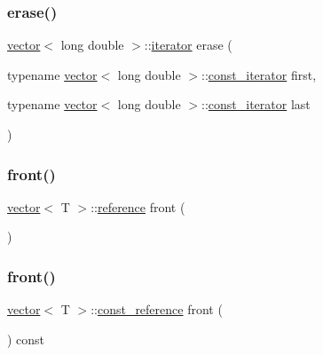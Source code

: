 \subsubsection{\texorpdfstring{erase()}{erase()}\hspace{0.1cm}{\footnotesize\ttfamily [28/28]}}
{\footnotesize\ttfamily \mbox{\hyperlink{classvector}{vector}}$<$ long double $>$\+::\mbox{\hyperlink{classvector_a35c955cacac6aacaa1e82874b1628865}{iterator}} erase (\begin{DoxyParamCaption}\item[{typename \mbox{\hyperlink{classvector}{vector}}$<$ long double $>$\+::\mbox{\hyperlink{classvector_a2fc97dce62b7053449cc868607540dba}{const\+\_\+iterator}}}]{first,  }\item[{typename \mbox{\hyperlink{classvector}{vector}}$<$ long double $>$\+::\mbox{\hyperlink{classvector_a2fc97dce62b7053449cc868607540dba}{const\+\_\+iterator}}}]{last }\end{DoxyParamCaption})}

\mbox{\label{classvector_ad1bd7e6ac099a63c622f22a3c8777d2b}} 
\subsubsection{\texorpdfstring{front()}{front()}\hspace{0.1cm}{\footnotesize\ttfamily [1/2]}}
{\footnotesize\ttfamily \mbox{\hyperlink{classvector}{vector}}$<$ T $>$\+::\mbox{\hyperlink{classvector_a9b1a63f171d76a7a3995b6858e99f2ea}{reference}} front (\begin{DoxyParamCaption}{ }\end{DoxyParamCaption})}

\mbox{\label{classvector_a1d3efc0c1fe3ca55429ac84c5bb8c686}} 
\subsubsection{\texorpdfstring{front()}{front()}\hspace{0.1cm}{\footnotesize\ttfamily [2/2]}}
{\footnotesize\ttfamily \mbox{\hyperlink{classvector}{vector}}$<$ T $>$\+::\mbox{\hyperlink{classvector_af9ba3e25df088c62f7d535b91672cda9}{const\+\_\+reference}} front (\begin{DoxyParamCaption}{ }\end{DoxyParamCaption}) const}

